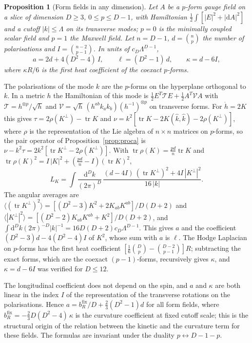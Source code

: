 \documentclass[11pt,a4paper]{article}
\makeatletter
\theoremstyle{stmt}
\newtheorem{proposition}[theorem]{Proposition}
\theoremstyle{defn}
\theoremstyle{rmk}
\renewenvironment{proof}[1][\proofname]{\par\pushQED{\qed}\normalfont\topsep6\p@\@plus6\p@\relax
  \trivlist\item[\hskip\labelsep{\sffamily\itshape\small #1.}]\ignorespaces}{\popQED\endtrivlist\@endpefalse}
\numberwithin{equation}{section}
\newcommand{\dd}{\mathrm{d}}
\makeatother
\begin{document}
\begin{proposition}[Form fields in any dimension]\label{prop:pforms}
Let $A$ be a $p$-form gauge field on a slice of dimension $D\ge3$, $0\le p\le D-1$, with Hamiltonian $\tfrac12\int[|E|^2+|\dd A|^2]$ and a cutoff $|k|\le\Lambda$ on its transverse modes; $p=0$ is the minimally coupled scalar field and $p=1$ the Maxwell field. Let $n=D-1$, $d=\binom np$ the number of polarisations and $I=\binom{n-2}{p-1}$. In units of $c_D\Lambda^{D-1}$,
\begin{equation}\label{eq:pforms}
a=2d+4(D^2-4)\,I,\qquad\ell=(D^2-1)\,d,\qquad\kappa=d-6I,
\end{equation}
where $\kappa R/6$ is the first heat coefficient of the coexact $p$-forms.
\end{proposition}

\begin{proof}
The polarisations of the mode $k$ are the $p$-forms on the hyperplane orthogonal to $k$. In a metric $h$ the Hamiltonian of this mode is $\tfrac12E^{T}\mathcal TE+\tfrac12A^{T}\mathcal VA$ with $\mathcal T=h^{\otimes p}/\sqrt h$ and $\mathcal V=\sqrt h\,(h^{ab}k_ak_b)(h^{-1})^{\otimes p}$ on transverse forms. For $\dot h=2K$ this gives $\tau=2\rho(K^\perp)-\operatorname{tr}K$ and $\nu=k^2[\operatorname{tr}K-2K(\hat k,\hat k)-2\rho(K^\perp)]$, where $\rho$ is the representation of the Lie algebra of $n\times n$ matrices on $p$-forms, so the pair operator of Proposition~\ref{prop:proca} is $\nu-k^2\tau=2k^2[\operatorname{tr}K^\perp-2\rho(K^\perp)]$. With $\operatorname{tr}\rho(K)=\tfrac{pd}{n}\operatorname{tr}K$ and $\operatorname{tr}\rho(K)^2=I\,|K|^2+(\tfrac{pd}n-I)(\operatorname{tr}K)^2$,
\[
L_K=\int\frac{\dd^Dk}{(2\pi)^D}\,\frac{(d-4I)\,(\operatorname{tr}K^\perp)^2+4I\,|K^\perp|^2}{16\,|k|}.
\]
The angular averages are $\langle(\operatorname{tr}K^\perp)^2\rangle=[(D^2-3)K^2+2K_{ab}K^{ab}]/D(D+2)$ and $\langle|K^\perp|^2\rangle=[(D^2-2)K_{ab}K^{ab}+K^2]/D(D+2)$, and $\int\dd^Dk(2\pi)^{-D}|k|^{-1}=16D(D+2)c_D\Lambda^{D-1}$. This gives $a$ and the coefficient $(D^2-3)d-4(D^2-4)I$ of $K^2$, whose sum with $a$ is $\ell$. The Hodge Laplacian on $p$-forms has the first heat coefficient $[\tfrac16\binom Dp-\binom{D-2}{p-1}]R$; subtracting the exact forms, which are the coexact $(p-1)$-forms, recursively gives $\kappa$, and $\kappa=d-6I$ was verified for $D\le12$.
\end{proof}

The longitudinal coefficient does not depend on the spin, and $a$ and $\kappa$ are both linear in the index $I$ of the representation of the transverse rotations on the polarisations. Hence $a=b_R^{\mathrm{fix}}/D+\tfrac23(D^2-1)d$ for all form fields, where $b_R^{\mathrm{fix}}=-\tfrac23D(D^2-4)\,\kappa$ is the curvature coefficient at fixed cutoff scale; this is the structural origin of the relation between the kinetic and the curvature term for these fields. The formulas are invariant under the duality $p\leftrightarrow D-1-p$.
\end{document}
